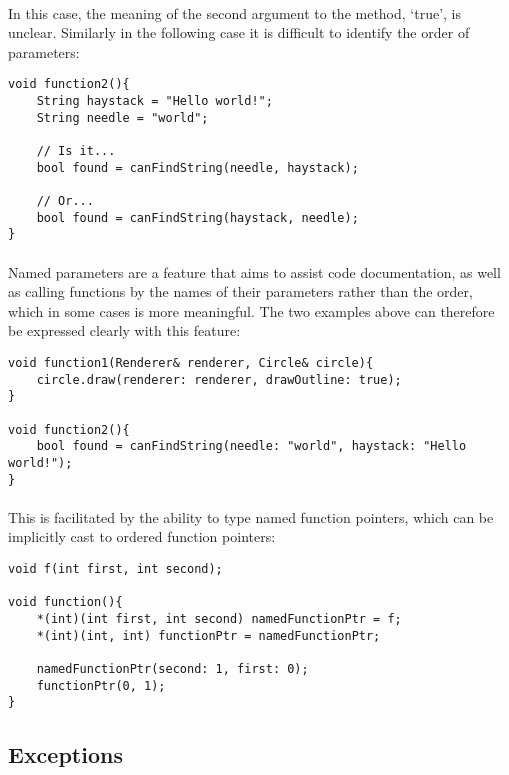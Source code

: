 \documentclass[12pt,twoside,notitlepage]{report}
\begin{document}
\paragraph{}
In this case, the meaning of the second argument to the method, `true', is unclear. Similarly in the following case it is difficult to identify the order of parameters:


\begin{lstlisting}
void function2(){
	String haystack = "Hello world!";
	String needle = "world";
	
	// Is it...
	bool found = canFindString(needle, haystack);
	
	// Or...
	bool found = canFindString(haystack, needle);
}
\end{lstlisting}


\paragraph{}
Named parameters are a feature that aims to assist code documentation, as well as calling functions by the names of their parameters rather than the order, which in some cases is more meaningful. The two examples above can therefore be expressed clearly with this feature:


\begin{lstlisting}
void function1(Renderer& renderer, Circle& circle){
	circle.draw(renderer: renderer, drawOutline: true);
}

void function2(){
	bool found = canFindString(needle: "world", haystack: "Hello world!");
}
\end{lstlisting}


\paragraph{}
This is facilitated by the ability to type named function pointers, which can be implicitly cast to ordered function pointers:


\begin{lstlisting}
void f(int first, int second);

void function(){
	*(int)(int first, int second) namedFunctionPtr = f;
	*(int)(int, int) functionPtr = namedFunctionPtr;
	
	namedFunctionPtr(second: 1, first: 0);
	functionPtr(0, 1);
}
\end{lstlisting}


\clearpage

\subsection{Exceptions}
\end{document}
